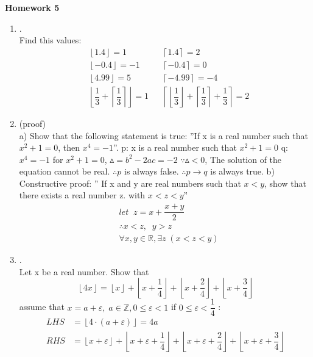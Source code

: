 \documentclass{article}
\theoremstyle{definition}
\theoremstyle{plain}
\providecommand{\ceil}[1]{\left \lceil #1 \right \rceil }
\providecommand{\floor}[1]{\left \lfloor #1 \right \rfloor }
\begin{document}
\begin{center} \bf \LARGE Homework 5\\
\end{center}


\begin {enumerate}[itemindent=30pt,label=\bf Exercise {\arabic*}:]

\item .\\
Find this values:
\begin{align*}
	&\floor{1.4} = 1    &&\ceil{1.4} = 2   \\
	&\floor{-0.4} = -1  &&\ceil{-0.4} = 0  \\
	&\floor{4.99} = 5   &&\ceil{-4.99} = -4 \\
	&\floor{\dfrac{1}{3} + \ceil{\dfrac{1}{3}}} = 1 
	&&\ceil{ \floor{\dfrac{1}{3}} + \ceil{\dfrac{1}{3}} + \dfrac{1}{3}} = 2
\end{align*}
\item (proof)\\
\subitem a) Show that the following statement is true: 
\subitem \qquad ''If x is a real number such that $x^{2}+1=0$, then $x^{4}=-1$''.
\subitem p: x is a real number such that $x^{2}+1=0$
\subitem q: $x^{4}=-1$
\subitem for $x^{2} + 1 = 0$, $\vartriangle = b^{2} - 2ac = -2$
\subitem $\because \vartriangle < 0 $, The solution of the equation cannot be real. 
\subitem $\therefore p$ is always false.
\subitem $\therefore p \to q$ is always true.
\subitem b) Constructive proof:
\subitem \qquad '' If x and y are real numbers such that $x < y$, show that there exists a real number z. with $x <z < y$''
\begin{align*}
	&let\;\; z = x + \dfrac{x+y}{2}\\
	&\therefore x < z, \;\;y > z\\
	&\forall x,y \in \mathbb{R}, \exists z\;(x < z < y)
\end{align*}
\item .\\
Let x be a real number. Show that $$\floor{4x} = \floor{x} + \floor{x + \dfrac{1}{4}} + \floor{x + \dfrac{2}{4}} + \floor{x + \dfrac{3}{4}} $$
\subitem assume that $x = a + \varepsilon,\; a \in \mathbb{Z}, 0 \leqslant \varepsilon < 1 $ 
\subitem if $0 \leqslant \varepsilon < \dfrac{1}{4}$ :
\begin{align*}
	LHS &= \floor{4\cdot(a + \varepsilon)} = 4a\\
	RHS &= \floor{x + \varepsilon} + \floor{x + \varepsilon + \dfrac{1}{4}} + \floor{x + \varepsilon + \dfrac{2}{4}} + \floor{x + \varepsilon + \dfrac{3}{4}}\\

\end{align*}
\end{enumerate}
\end{document}
